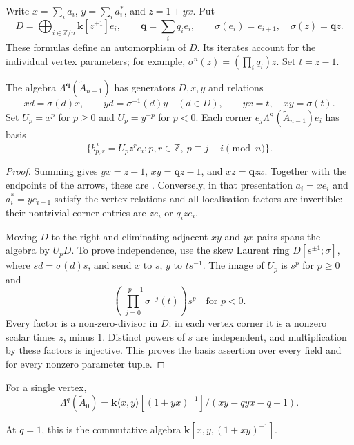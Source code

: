\documentclass[a4paper]{amsart}
\newcommand{\kk}{\mathbf{k}}
\newcommand{\ZZ}{\mathbb{Z}}
\numberwithin{equation}{section}
\begin{document}
Write $x=\sum_i a_i$, $y=\sum_i a_i^*$, and $z=1+yx$. Put
\[
 D=\bigoplus_{i\in\ZZ/n}\kk[z^{\pm1}]e_i,\qquad
 \boldsymbol q=\sum_iq_ie_i,
 \qquad \sigma(e_i)=e_{i+1},\quad \sigma(z)=\boldsymbol qz.
\]
These formulas define an automorphism of $D$. Its iterates account
for the individual vertex parameters; for example,
$\sigma^n(z)=(\prod_iq_i)z$. Set $t=z-1$.

\begin{proposition}\label{prop:bulk-cycle}
The algebra $\Lambda^{\boldsymbol q}(\widetilde A_{n-1})$ has generators $D,x,y$ and relations
\begin{equation}\label{eq:bulk-gwa}
 xd=\sigma(d)x,\qquad yd=\sigma^{-1}(d)y\quad(d\in D),
 \qquad yx=t,\quad xy=\sigma(t).
\end{equation}
Set $U_p=x^p$ for $p\ge0$ and $U_p=y^{-p}$ for $p<0$.
Each corner $e_j\Lambda^{\boldsymbol q}(\widetilde A_{n-1})e_i$ has basis
\begin{equation}\label{eq:bulk-cycle-basis}
 \bigl\{b_{p,r}^{\,i}=U_pz^re_i:
 p,r\in\ZZ,\ p\equiv j-i\pmod n\bigr\}.
\end{equation}
\end{proposition}

\begin{proof}
Summing  gives $yx=z-1$,
$xy=\boldsymbol qz-1$, and
$xz=\boldsymbol qzx$. Together with the endpoints of the arrows,
these are . Conversely, in that presentation
$a_i=xe_i$ and $a_i^*=ye_{i+1}$ satisfy the vertex relations and
all localisation factors are invertible: their nontrivial corner
entries are $ze_i$ or $q_ize_i$.

Moving $D$ to the right and eliminating adjacent $xy$ and $yx$
pairs spans the algebra by $U_pD$. To prove independence, use the
skew Laurent ring $D[s^{\pm1};\sigma]$, where $sd=\sigma(d)s$,
and send $x$ to $s$, $y$ to $ts^{-1}$. The image of $U_p$ is
$s^p$ for $p\geq0$ and
\[
 \left(\prod_{j=0}^{-p-1}\sigma^{-j}(t)\right)s^p
 \quad\text{for }p<0.
\]
Every factor is a non-zero-divisor in $D$: in each vertex corner
it is a nonzero scalar times $z$, minus $1$. Distinct powers of $s$
are independent, and multiplication by these factors is injective.
This proves the basis assertion over every field and for every
nonzero parameter tuple.
\end{proof}

For a single vertex,
\[
 \Lambda^q(\widetilde A_0)=
 \kk\langle x,y\rangle[(1+yx)^{-1}]/(xy-qyx-q+1).
\]

At $q=1$, this is the commutative algebra
$\kk[x,y,(1+xy)^{-1}]$.
\end{document}
